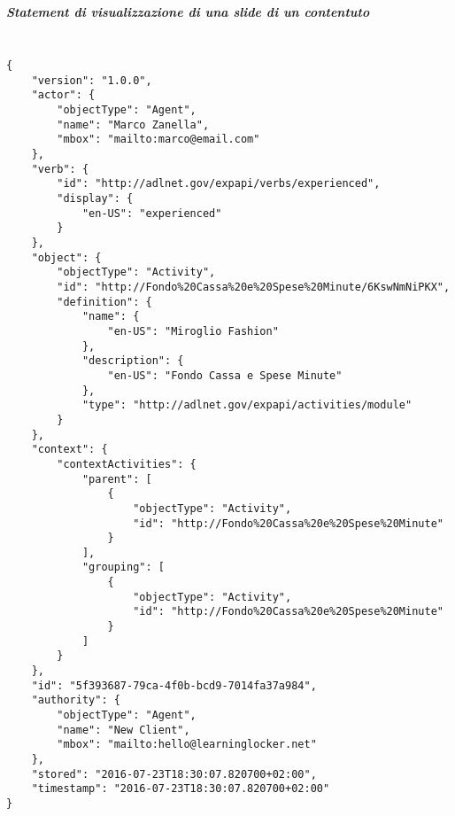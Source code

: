 	\subparagraph*{Statement di visualizzazione di una slide di un contentuto\\\\}
	\begin{lstlisting}
{
    "version": "1.0.0",
    "actor": {
        "objectType": "Agent",
        "name": "Marco Zanella",
        "mbox": "mailto:marco@email.com"
    },
    "verb": {
        "id": "http://adlnet.gov/expapi/verbs/experienced",
        "display": {
            "en-US": "experienced"
        }
    },
    "object": {
        "objectType": "Activity",
        "id": "http://Fondo%20Cassa%20e%20Spese%20Minute/6KswNmNiPKX",
        "definition": {
            "name": {
                "en-US": "Miroglio Fashion"
            },
            "description": {
                "en-US": "Fondo Cassa e Spese Minute"
            },
            "type": "http://adlnet.gov/expapi/activities/module"
        }
    },
    "context": {
        "contextActivities": {
            "parent": [
                {
                    "objectType": "Activity",
                    "id": "http://Fondo%20Cassa%20e%20Spese%20Minute"
                }
            ],
            "grouping": [
                {
                    "objectType": "Activity",
                    "id": "http://Fondo%20Cassa%20e%20Spese%20Minute"
                }
            ]
        }
    },
    "id": "5f393687-79ca-4f0b-bcd9-7014fa37a984",
    "authority": {
        "objectType": "Agent",
        "name": "New Client",
        "mbox": "mailto:hello@learninglocker.net"
    },
    "stored": "2016-07-23T18:30:07.820700+02:00",
    "timestamp": "2016-07-23T18:30:07.820700+02:00"
}
	\end{lstlisting}
    
